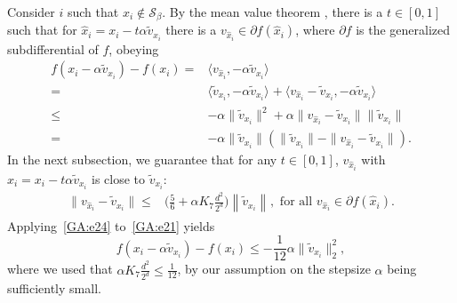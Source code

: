 \documentclass[11pt]{article}
\newcommand{\inner}[3][]{{\langle #2,#3 \rangle_{#1}}} %
\newcommand{\Tnorm}{}
\newcommand\norm[2][\Tnorm]{\ensuremath{{\left\|#2\right\|}_{#1}}}
\newcommand\setS{\mathcal S}
\newcommand\stepdir[1]{\tilde v_{#1}}
\begin{document}
Consider $i$ such that $x_i \notin \setS_\beta$.  %
 By the mean value theorem \cite[Theorem~8.13]{clason_2018}, there is a $t \in [0,1]$ such that for $\hat{x}_{i} = x_{i} - t \alpha \stepdir{x_i}$ there is a $v_{\hat{x}_{i}} \in \partial f(\hat{x}_{i})$, where $\partial f$ is the generalized subdifferential of $f$, obeying
\begin{align}
f(x_{i} - \alpha \stepdir{x_i}) - f(x_{i})
=&
\inner[]{v_{\hat{x}_{i}}}{- \alpha \stepdir{x_i}} \nonumber \\
=&
\inner[]{\stepdir{x_i}}{- \alpha \stepdir{x_i}} + \inner[]{v_{\hat{x}_{i}} - \stepdir{x_i}}{- \alpha \stepdir{x_i}} \nonumber \\
\leq&
- \alpha \|\stepdir{x_i}\|^2
+ \alpha \|v_{\hat{x}_{i}} - \stepdir{x_i}\| \|\stepdir{x_i}\| \nonumber \\
=&
- \alpha \|\stepdir{x_i}\|
(\|\stepdir{x_i}\| -  \|v_{\hat{x}_{i}} - \stepdir{x_i}\| ). \label{GA:e21}
\end{align}
In the next subsection, we guarantee that for any $t\in [0,1]$, $v_{\hat{x}_{i}}$ with
$\hat{x}_{i} = x_{i} - t \alpha \stepdir{x_i}$
is close to $\stepdir{x_i}$:
\begin{align}
\|v_{\hat{x}_{i}} - \stepdir{x_i}\|
\leq&
\biggl(\frac{5}{6}  + \alpha K_7 \frac{d^2}{2^d}\biggr)
\norm{ \stepdir{x_i} },  \text { for all } v_{\hat{x}_{i}} \in \partial f(\hat{x}_i).
\label{GA:e24}
\end{align}
Applying~\eqref{GA:e24} to~\eqref{GA:e21} yields
\begin{equation*}
f(x_{i} - \alpha \stepdir{x_i}) - f(x_{i})
\leq
- \frac{1}{12} \alpha \|\stepdir{x_i}\|_2^2,
\end{equation*}
where we used that $\alpha K_7 \frac{d^2}{2^d} \leq \frac{1}{12}$, by our assumption on the stepsize $\alpha$ being sufficiently small.
\end{document}
